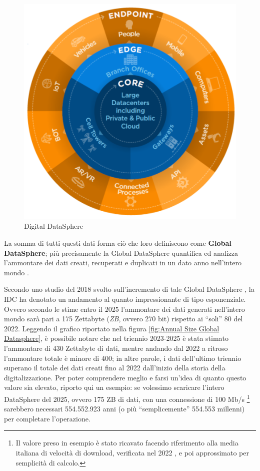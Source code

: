 \begin{figure}[H]
    \centering
    \includegraphics[width=0.5\linewidth]{figure/capitolo_1/Digital-Datasphere.pdf}
    \caption{Digital DataSphere}
    \label{fig:Digital-Datasphere}
\end{figure}

La somma di tutti questi dati forma ciò che loro definiscono come \textbf{Global DataSphere}; più precisamente la Global DataSphere quantifica ed analizza l'ammontare dei dati creati, recuperati e duplicati in un dato anno nell'intero mondo \cite{datadrivendaily_dimension_table}.

Secondo uno studio del 2018 svolto sull'incremento di tale Global DataSphere \cite{idc_global_datasphere}, la IDC ha denotato un andamento al quanto impressionante di tipo esponenziale. Ovvero secondo le stime entro il 2025 l'ammontare dei dati generati nell'intero mondo sarà pari a 175 Zettabyte (\textit{ZB}, ovvero 270 bit) rispetto ai ``soli'' 80 del 2022. Leggendo il grafico riportato nella figura \ref{fig:Annual Size Global Datasphere}, è possibile notare che nel triennio 2023-2025 è stata stimato l'ammontare di 430 Zettabyte di dati, mentre andando dal 2022 a ritroso l'ammontare totale è minore di 400; in altre parole, i dati dell'ultimo triennio superano il totale dei dati creati fino al 2022 dall'inizio della storia della digitalizzazione. Per poter comprendere meglio e farsi un'idea di quanto questo valore sia elevato, riporto qui un esempio: se volessimo scaricare l'intero DataSphere del 2025, ovvero 175 ZB di dati, con una connessione di 100 Mb/s \footnote{Il valore preso in esempio è stato ricavato facendo riferimento alla media italiana di velocità di download, verificata nel 2022 \cite{github_speed_connection}, e poi approssimato per semplicità di calcolo.} sarebbero necessari 554.552.923 anni (o più ``semplicemente'' 554.553 millenni) per completare l'operazione.

